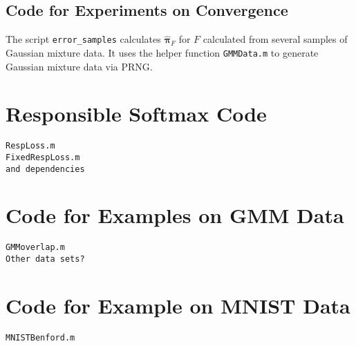 \section{Code for Experiments on Convergence}
The script \verb|error_samples| calculates \( \hat{\bm \pi}_F \) for \( F \) calculated from several samples of Gaussian mixture data. It uses the helper function \verb|GMMData.m| to generate Gaussian mixture data via PRNG.






\chapter{Responsible Softmax Code}
\begin{verbatim}
RespLoss.m 
FixedRespLoss.m
and dependencies
\end{verbatim}

\chapter{Code for Examples on GMM Data}
\begin{verbatim}
GMMoverlap.m 
Other data sets?
\end{verbatim}

\chapter{Code for Example on MNIST Data}
\begin{verbatim}
MNISTBenford.m
\end{verbatim}